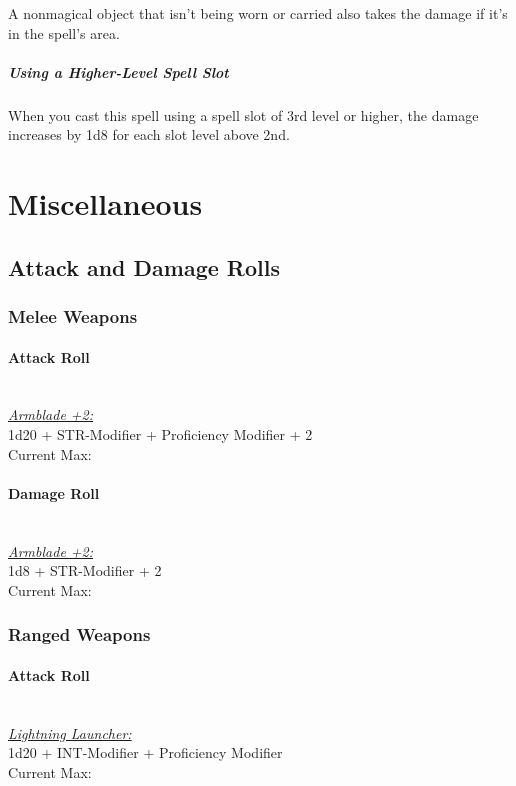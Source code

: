 \documentclass[letterpaper,openany,oneside,twocolumn]{book}
\begin{document}
A nonmagical object that isn't being worn or carried also takes the damage if it's in the spell's area.

\subparagraph*{Using a Higher-Level Spell Slot} When you cast this spell using a spell slot of 3rd level or higher, the damage increases by 1d8 for each slot level above 2nd.

\vfill\eject

\section*{Miscellaneous}
\subsection*{Attack and Damage Rolls}
\subsubsection*{Melee Weapons}
\paragraph*{Attack Roll}\hfill\\
\underline{\textit{Armblade +2:}}\\
1d20 + STR-Modifier + Proficiency Modifier + 2\\
\indent Current Max: 
\\
\paragraph*{Damage Roll}\hfill\\
\underline{\textit{Armblade +2:}}\\
1d8 + STR-Modifier + 2\\
\indent Current Max: 
\subsubsection*{Ranged Weapons}
\paragraph*{Attack Roll}\hfill\\
\underline{\textit{Lightning Launcher:}}\\
1d20 + INT-Modifier + Proficiency Modifier\\
\indent Current Max: 
\\
\end{document}
